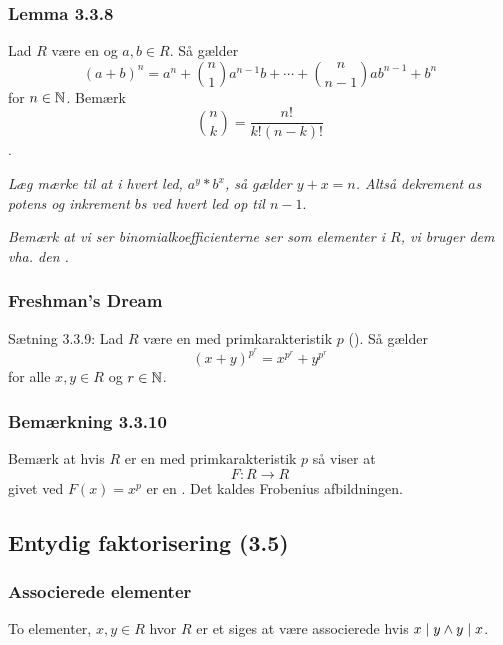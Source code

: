 \subsubsection{Lemma 3.3.8}
\label{Lemma 3.3.8}
Lad $R$ være en  og $a,b \in R$. Så gælder
\begin{equation*}
  (a + b)^n = a^n + \binom{n}{1}a^{n-1}b + \cdots + \binom{n}{n-1}ab^{n-1}+b^n
\end{equation*}
for $n \in \mathbb{N}$. Bemærk \[\binom{n}{k} = \frac{n!}{k!(n-k)!}\].

\textit{Læg mærke til at i hvert led, $a^y * b^x$, så gælder $y + x = n$. Altså
dekrement $a$s potens og inkrement $b$s ved hvert led op til $n-1$}.

\textit{Bemærk at vi ser binomialkoefficienterne ser som elementer i $R$, vi
bruger dem vha. den .}

\subsubsection{Freshman's Dream}
\label{Freshmans Dream}
Sætning 3.3.9: Lad $R$ være en  med primkarakteristik $p$
(). Så gælder
\begin{equation*}
  (x + y)^{p^{r}} = x^{p^{r}} + y^{p^{r}}
\end{equation*}
for alle $x, y \in R$ og $r \in \mathbb{N}$.

\subsubsection{Bemærkning 3.3.10}
\label{Bemaerkning 3.3.10}
Bemærk at hvis $R$ er en  med primkarakteristik $p$ så viser
 at
\begin{equation*}
  F: R \rightarrow R
\end{equation*}
givet ved $F(x) = x^p$ er en . Det kaldes Frobenius
afbildningen.

\subsection{Entydig faktorisering (3.5)}
\subsubsection{Associerede elementer}
\label{Associerede elementer}
To elementer, $x,y \in R$ hvor $R$ er et  siges at være
associerede hvis $x \mid y \wedge y \mid x$.

